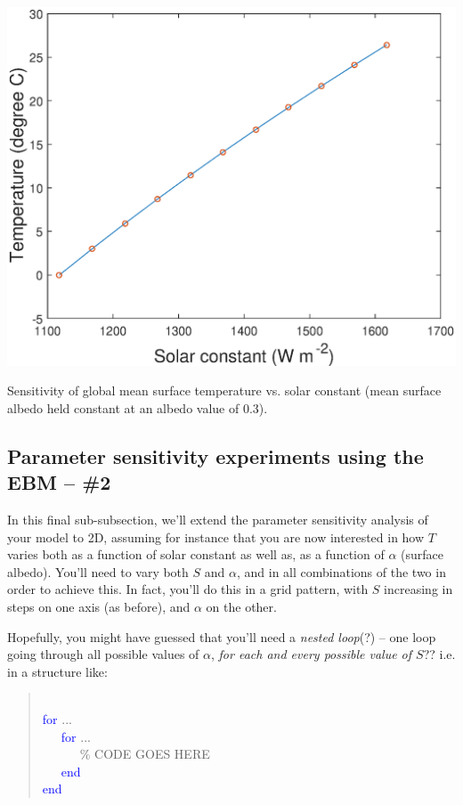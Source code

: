 \documentclass{tufte-book} %
\newenvironment{docspec}{\begin{quotation}\ttfamily\parskip0pt\parindent0pt\ignorespaces}{\end{quotation}}
\begin{document}
\begin{marginfigure}[-0.5in]
\includegraphics[width=\linewidth]{ch8-sens1D.eps}
\caption{Sensitivity of global mean surface temperature vs. solar constant (mean surface albedo held constant at an albedo value of 0.3).}
\label{fig:ch8-sens1D}
\end{marginfigure}

%
\newpage

\subsection{Parameter sensitivity experiments using the EBM -- \#2}

In this final sub-subsection, we'll extend the parameter sensitivity analysis of your model to 2D, assuming for instance that you are  now interested in  how \(T\)  varies both as a function of solar constant as well as, as a function of \(\alpha\) (surface albedo). You'll need to vary both \(S\) and \(\alpha\), and in all combinations of the two in order to achieve this. In fact, you'll do this in a grid pattern, with \(S\) increasing in steps on one axis (as before), and \(\alpha\) on the other.

Hopefully, you might have guessed that you'll need a \textit{nested loop}(?) -- one loop going through all possible values of \(\alpha\), \textit{for each and every possible value of \(S\)}?? i.e. in a structure like:
\vspace{-1mm}\begin{docspec}
\\\textcolor{blue}{for} ...
\\ \ \ \ \textcolor{blue}{for} ...
\\ \ \ \ \ \ \ \textcolor[rgb]{0,0.501961,0}{\% CODE GOES HERE}
\\ \ \ \ \textcolor{blue}{end}
\\\textcolor{blue}{end}
\end{docspec}\vspace{-1mm}
\end{document}
